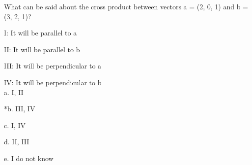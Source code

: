 
What can be said about the cross product between vectors a = (2, 0, 1) and b = (3, 2, 1)? 

I: It will be parallel to a

II: It will be parallel to b

III: It will be perpendicular to a

IV: It will be perpendicular to b \\

a. I, II

*b. III, IV

c. I, IV

d. II, III

e. I do not know \\
